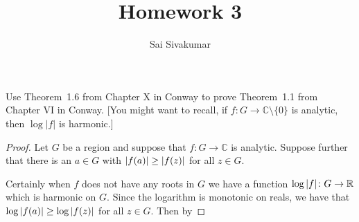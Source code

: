 \documentclass[12pt]{amsart}
\title{Homework 3}
\author{Sai Sivakumar}
\newcommand{\CC}{\mathbb{C}}
\begin{document}
\maketitle
\thispagestyle{empty}
Use Theorem~1.6 from Chapter X  in Conway to prove Theorem~1.1 from Chapter VI  in Conway.
[You might want to recall, if $f:G\to \CC\setminus \{0\}$ is analytic,  then $\log |f|$  is harmonic.]

 \bigskip

\begin{proof}
\baselineskip=24pt
Let $G$ be a region and suppose that $f\colon G\to \mathbb{C}$ is analytic. Suppose further that there is an $a\in G$ with $\abs{f(a)}\geq \abs{f(z)}$ for all $z\in G$.

Certainly when $f$ does not have any roots in $G$ we have a function $\log\abs{f}\colon G\to \mathbb{R}$ which is harmonic on $G$. Since the logarithm is monotonic on reals, we have that $\log\abs{f(a)}\geq \log\abs{f(z)}$ for all $z\in G$. Then by 
\end{proof}
\end{document}
